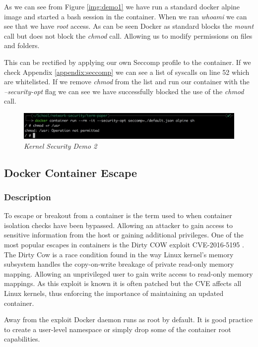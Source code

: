 As we can see from Figure \ref{img:demo1} we have run a standard docker alpine image and started a bash session in the container. When we ran \textit{whoami} we can see that we have \textit{root} access. As can be seen Docker as standard blocks the \textit{mount} call but does not block the \textit{chmod} call. Allowing us to modify permissions on files and folders.

This can be rectified by applying our own Seccomp profile to the container. If we check Appendix \ref{appendix:seccomp} we can see a list of syscalls on line 52 which are whitelisted. If we remove \textit{chmod} from the list and run our container with the \textit{--security-opt} flag we can see we have successfully blocked the use of the \textit{chmod} call.

\begin{figure}[!ht]
\centering
\includegraphics*[width=\textwidth]{images/term2.png}
\caption{\em Kernel Security Demo 2}
\label{img:demo2}
\end{figure}
\newpage
\subsection{Docker Container Escape}
\label{sub:escape}
\subsubsection{Description}
To escape or breakout from a container is the term used to when container isolation checks have been bypassed. Allowing an attacker to gain access to sensitive information from the host or gaining additional privileges. One of the most popular escapes in containers is the Dirty COW exploit CVE-2016-5195 \citep{cve-2016-5195}. The Dirty Cow is a race condition found in the way Linux kernel's memory subsystem handles the copy-on-write breakage of private read-only memory mapping. Allowing an unprivileged user to gain write access to read-only memory mappings. As this exploit is known it is often patched but the CVE affects all Linux kernels, thus enforcing the importance of maintaining an updated container.

Away from the exploit Docker daemon runs as root by default. It is good practice to create a user-level namespace or simply drop some of the container root capabilities.

